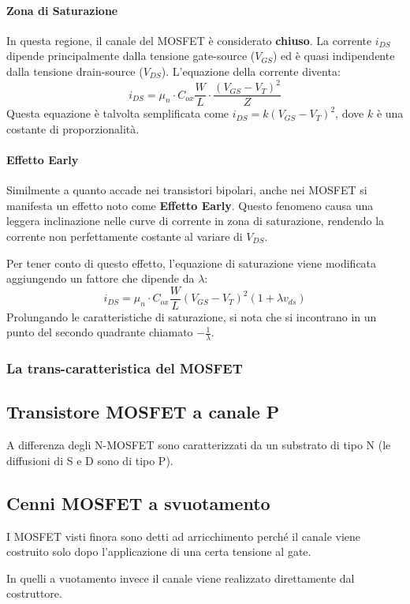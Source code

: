\documentclass[11pt,a4paper,]{article}
\begin{document}
\paragraph{Zona di Saturazione}

In questa regione, il canale del MOSFET è considerato \textbf{chiuso}. La corrente $i_{DS}$ dipende principalmente dalla tensione gate-source ($V_{GS}$) ed è quasi indipendente dalla tensione drain-source ($V_{DS}$). L'equazione della corrente diventa:
$$i_{DS} = \mu_n \cdot C_{ox} \frac{W}{L} \cdot \frac{(V_{GS} - V_T)^2}{Z}$$
Questa equazione è talvolta semplificata come $i_{DS} = k(V_{GS} - V_T)^2$, dove $k$ è una costante di proporzionalità.

\paragraph{Effetto Early}

Similmente a quanto accade nei transistori bipolari, anche nei MOSFET si manifesta un effetto noto come \textbf{Effetto Early}. Questo fenomeno causa una leggera inclinazione nelle curve di corrente in zona di saturazione, rendendo la corrente non perfettamente costante al variare di $V_{DS}$.

Per tener conto di questo effetto, l'equazione di saturazione viene modificata aggiungendo un fattore che dipende da $\lambda$:
$$i_{DS} = \mu_n \cdot C_{ox} \frac{W}{L} (V_{GS} - V_T)^2 (1 + \lambda v_{ds})$$
Prolungando le caratteristiche di saturazione, si nota che si incontrano in un punto del secondo quadrante chiamato $-\frac{1}{\lambda}$.
\subsubsection{La trans-caratteristica del MOSFET}
\subsection{Transistore MOSFET a canale P}
A differenza degli N-MOSFET sono caratterizzati da un substrato di tipo N (le diffusioni di S e D sono di tipo P).
\subsection{Cenni MOSFET a svuotamento}
I MOSFET visti finora sono detti ad arricchimento perché il canale viene costruito solo dopo l'applicazione di una certa tensione al gate.

\noindent In quelli a vuotamento invece il canale viene realizzato direttamente dal costruttore.
\end{document}

